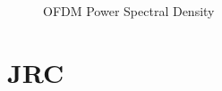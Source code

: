 \documentclass[conference]{IEEEtran}
\begin{document}
\begin{enumerate}
	\begin{figure}[H]
		\centering
    		\caption{OFDM Power Spectral Density}
    \end{figure}

    \section {JRC}

	\end{enumerate}
	
	\nocite{yang_subcarrier_multiplexing}
	{}
    
  
\end{document}

